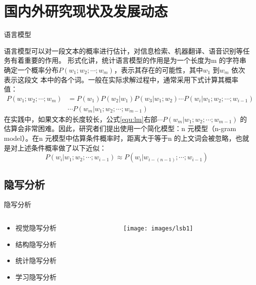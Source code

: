 \documentclass[14pt]{Bredelebeamer}
\begin{document}
\section{国内外研究现状及发展动态}
\begin{frame}{语言模型}

{\large
语言模型可以对一段文本的概率进行估计，对信息检索、机器翻译、语音识别等任务有着重要的作用。
形式化讲，统计语言模型的作用是为一个长度为m 的字符串确定一个概率分布$P(w_1;w_2;\cdots;w_m)$，表示其存在的可能性，其中$w_1$ 到$w_m$ 依次表示这段文
本中的各个词。一般在实际求解过程中，通常采用下式计算其概率值：
\begin{equation}
\label{equ:lm}
\begin{split}
P(w_1;w_2; \cdots;w_m) &= P(w_1) P(w_2|w_1) P(w_3|w_1;w_2)\cdots P(w_i | w_1;w_2;\cdots;w_{i-1}) \\
&\cdots P(w_m | w_1;w_2;\cdots;w_{m-1})
\end{split}
\end{equation}
在实践中，如果文本的长度较长，公式\ref{equ:lm}右部$\cdots P(w_m | w_1;w_2;\cdots;w_{m-1}) $ 的估算会非常困难。因此，研究者们提出使用一个简化模型：n 元模型（n-gram model）。在n 元模型中估算条件概率时，距离大于等于n 的上文词会被忽略，也就是对上述条件概率做了以下近似：
\begin{equation}
\label{equ:approx}
P(w_i | w_1;w_2;\cdots;w_{i-1})  \approx P(w_i | w_{i-(n-1)};\cdots;w_{i-1})
\end{equation}
}
\end{frame}


\subsection{隐写分析}

\begin{frame}{隐写分析}
  \begin{columns}
    \begin{column}{.25\textwidth}
      \begin{block}{}
        \begin{itemize}
          \item \alert<2>{视觉隐写分析}
          \item 结构隐写分析
          \item 统计隐写分析
          \item 学习隐写分析
        \end{itemize}
      \end{block}
    \end{column}
    \begin{column}{.7\textwidth}
      \pause
      \begin{figure}
        \centering
        \texttt{[image: images/lsb1]}
      \end{figure}
    \end{column}
  \end{columns}
\end{frame}
\end{document}
